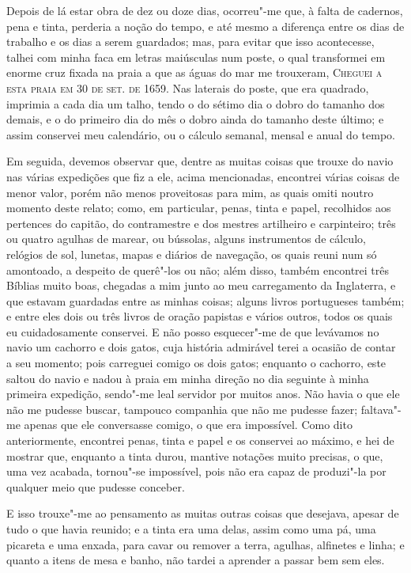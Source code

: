 Depois de lá estar obra de dez ou doze dias, ocorreu"-me que, à falta de
cadernos, pena e tinta, perderia a noção do tempo, e até mesmo a
diferença entre os dias de trabalho e os dias a serem guardados; mas,
para evitar que isso acontecesse, talhei com minha faca em letras
maiúsculas num poste, o qual transformei em enorme cruz fixada na praia
a que as águas do mar me trouxeram, \textsc{Cheguei a esta praia em 30
de set. de 1659.} Nas laterais do poste, que era quadrado, imprimia a
cada dia um talho, tendo o do sétimo dia o dobro do tamanho dos demais,
e o do primeiro dia do mês o dobro ainda do tamanho deste último; e
assim conservei meu calendário, ou o cálculo semanal, mensal e anual do
tempo.

Em seguida, devemos observar que, dentre as muitas coisas que trouxe do
navio nas várias expedições que fiz a ele, acima mencionadas, encontrei
várias coisas de menor valor, porém não menos proveitosas para mim, as
quais omiti noutro momento deste relato; como, em particular, penas,
tinta e papel, recolhidos aos pertences do capitão, do contramestre e
dos mestres artilheiro e carpinteiro; três ou quatro agulhas de marear,
ou bússolas, alguns instrumentos de cálculo, relógios de sol, lunetas,
mapas e diários de navegação, os quais reuni num só amontoado, a
despeito de querê"-los ou não; além disso, também encontrei três Bíblias
muito boas, chegadas a mim junto ao meu carregamento da Inglaterra, e
que estavam guardadas entre as minhas coisas; alguns livros portugueses
também; e entre eles dois ou três livros de oração papistas e vários
outros, todos os quais eu cuidadosamente conservei. E não posso
esquecer"-me de que levávamos no navio um cachorro e dois gatos, cuja
história admirável terei a ocasião de contar a seu momento; pois
carreguei comigo os dois gatos; enquanto o cachorro, este saltou do
navio e nadou à praia em minha direção no dia seguinte à minha primeira
expedição, sendo"-me leal servidor por muitos anos. Não havia o que ele
não me pudesse buscar, tampouco companhia que não me pudesse fazer;
faltava"-me apenas que ele conversasse comigo, o que era impossível. Como
dito anteriormente, encontrei penas, tinta e papel e os conservei ao
máximo, e hei de mostrar que, enquanto a tinta durou, mantive notações
muito precisas, o que, uma vez acabada, tornou"-se impossível, pois não
era capaz de produzi"-la por qualquer meio que pudesse conceber.

E isso trouxe"-me ao pensamento as muitas outras coisas que desejava,
apesar de tudo o que havia reunido; e a tinta era uma delas, assim como
uma pá, uma picareta e uma enxada, para cavar ou remover a terra,
agulhas, alfinetes e linha; e quanto a itens de mesa e banho, não tardei
a aprender a passar bem sem eles.

